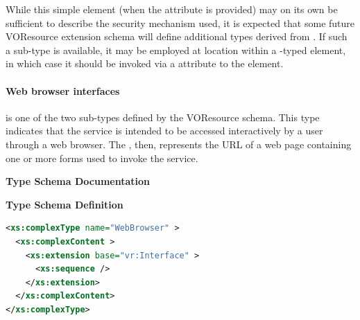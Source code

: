 \documentclass[11pt,a4paper]{ivoa}
\begin{document}

While this simple element (when the  attribute
is provided) may on its own be sufficient to describe the security
mechanism used, it is expected that some future
VOResource extension schema will define
additional types derived from .  If such
a sub-type is available, it may be employed at
 location within a
-typed element, in which case it should be
invoked via a  attribute to the
 element.


\paragraph{Web browser interfaces}

 is one of the two 
sub-types defined by the VOResource schema.  This type indicates that
the service is intended to be accessed interactively by a user through
a web browser.  The , then, represents
the URL of a web page containing one or more forms used to invoke the
service.


\begin{generated}
\begingroup
        \renewcommand*\descriptionlabel[1]{%
        \hbox to 5.5em{\emph{#1}\hfil}}\vspace{2ex}\noindent\textbf{ Type Schema Documentation}



\vspace{1ex}\noindent\textbf{ Type Schema Definition}

\begin{lstlisting}[language=XML,basicstyle=\footnotesize]
<xs:complexType name="WebBrowser" >
  <xs:complexContent >
    <xs:extension base="vr:Interface" >
      <xs:sequence />
    </xs:extension>
  </xs:complexContent>
</xs:complexType>
\end{lstlisting}\endgroup
\end{generated}
\end{document}
